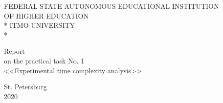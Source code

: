 \newpage
\begin{titlepage}

\begin{center}\large{
    FEDERAL STATE AUTONOMOUS EDUCATIONAL INSTITUTION \\
    OF HIGHER EDUCATION \\*
    ITMO UNIVERSITY \\*
}\end{center}

\vspace{12em}

\begin{center}\large{
    Report \\
    on the practical task No. 1 \\
    <<Experimental time complexity analysis>>
}\end{center}

\vspace{8.5em}

\vspace{1.5em}

\vspace{\fill}

\begin{center}
    St. Petersburg \\
    2020
\end{center}

\end{titlepage}
